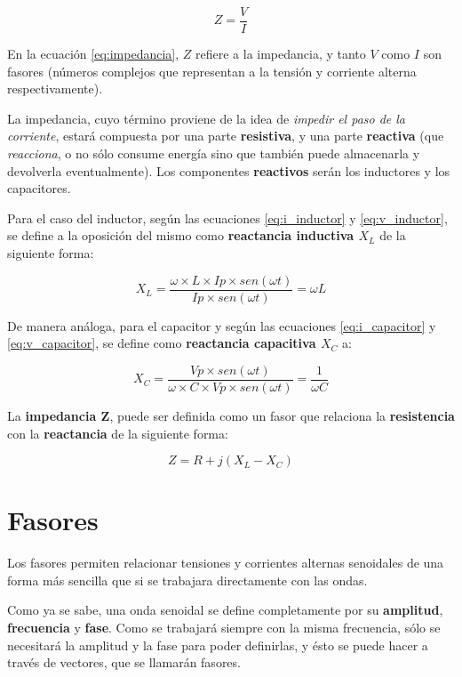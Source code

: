 \begin{equation}
	\label{eq:impedancia}
	Z=\frac{V}{I}
\end{equation}

En la ecuación \ref{eq:impedancia}, $Z$ refiere a la impedancia, y tanto $V$ como $I$ son fasores (números complejos que representan a la tensión y corriente alterna respectivamente).

La impedancia, cuyo término proviene de la idea de \textit{impedir el paso de la corriente}, estará compuesta por una parte \textbf{resistiva}, y una parte \textbf{reactiva} (que \textit{reacciona}, o no sólo consume energía sino que también puede almacenarla y devolverla eventualmente). Los componentes \textbf{reactivos} serán los inductores y los capacitores.

Para el caso del inductor, según las ecuaciones \ref{eq:i_inductor} y \ref{eq:v_inductor}, se define a la oposición del mismo como \textbf{reactancia inductiva $X_L$} de la siguiente forma:

$$ X_L = \frac{\omega \times L \times Ip \times sen(\omega t)}{Ip\times sen(\omega t)} = \omega L $$

De manera análoga, para el capacitor y según las ecuaciones \ref{eq:i_capacitor} y \ref{eq:v_capacitor}, se define como \textbf{reactancia capacitiva $X_C$} a:

$$ X_C = \frac{Vp\times sen(\omega t)}{\omega \times C \times Vp \times sen(\omega t)} = \frac{1}{\omega C} $$

La \textbf{impedancia Z}, puede ser definida como un fasor que relaciona la \textbf{resistencia} con la \textbf{reactancia} de la siguiente forma:

\begin{equation}
	\label{eq:impedancia_rectangular}
	Z = R + j(X_L-X_C)
\end{equation}

\section{Fasores}
Los fasores permiten relacionar tensiones y corrientes alternas senoidales de una forma más sencilla que si se trabajara directamente con las ondas.

Como ya se sabe, una onda senoidal se define completamente por su \textbf{amplitud}, \textbf{frecuencia} y \textbf{fase}. Como se trabajará siempre con la misma frecuencia, sólo se necesitará la amplitud y la fase para poder definirlas, y ésto se puede hacer a través de vectores, que se llamarán fasores.

